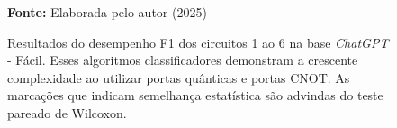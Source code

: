 \begin{figure}
\caption{Resultados do desempenho F1 dos circuitos 1 ao 6 na base \textit{ChatGPT} - Fácil. Esses algoritmos classificadores demonstram a crescente complexidade ao utilizar portas quânticas e portas CNOT. As marcações que indicam semelhança estatística são advindas do teste pareado de Wilcoxon.}
\label{fig:f1:easy:g1}
     \centering
    \centering

      \par\medskip\ABNTEXfontereduzida\selectfont\textbf{Fonte:} Elaborada pelo autor (2025) \par\medskip
\end{figure}